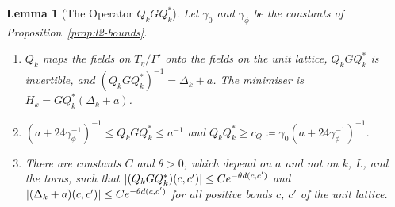 \documentclass[11pt]{preprint}
\DeclarePairedDelimiter{\abs}{\lvert}{\rvert}
\numberwithin{equation}{section}
\newtheorem{lemma}[theorem]{Lemma}
\theoremstyle{definition}
\theoremstyle{remark}
\theoremstyle{plain}
\begin{document}
\begin{lemma}[The Operator $Q_kGQ_k^*$]\label{lem:qgq}
Let $\gamma_0$ and $\gamma_\phi$ be the constants of Proposition~\ref{prop:l2-bounds}.
\begin{enumerate}[label=(\roman*)]
\item $Q_k$ maps the fields on $T_\eta/\Gamma'$ onto the fields on the unit lattice, $Q_kGQ_k^*$ is invertible, and $(Q_kGQ_k^*)^{-1} = \Delta_k + a$. The minimiser is $H_k = GQ_k^*(\Delta_k + a)$.
\item $(a + 24\gamma_\phi^{-1})^{-1} \leq Q_kGQ_k^* \leq a^{-1}$ and $Q_kQ_k^* \geq c_Q \coloneqq \gamma_0(a + 24\gamma_\phi^{-1})^{-1}$.
\item There are constants $C$ and $\theta > 0$, which depend on $a$ and not on $k$, $L$, and the torus, such that $\abs{(Q_kGQ_k^*)(c, c')} \leq Ce^{-\theta d(c, c')}$ and $\abs{(\Delta_k + a)(c, c')} \leq Ce^{-\theta d(c, c')}$ for all positive bonds $c$, $c'$ of the unit lattice.
\end{enumerate}
\end{lemma}
\end{document}
